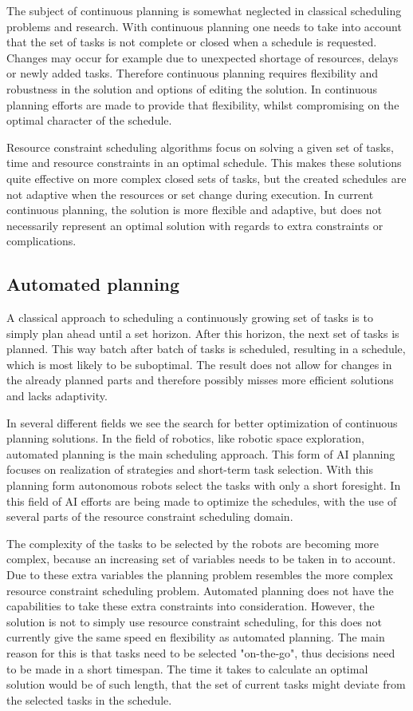 \documentclass{article}
\begin{document}
The subject of continuous planning is somewhat neglected in classical scheduling problems and research.
With continuous planning one needs to take into account that the set of tasks is not complete or closed when a schedule is requested.
Changes may occur for example due to unexpected shortage of resources, delays or newly added tasks.
Therefore continuous planning requires flexibility and robustness in the solution and options of editing the solution.
In continuous planning efforts are made to provide that flexibility, whilst compromising on the optimal character of the schedule.

Resource constraint scheduling algorithms focus on solving a given set of tasks, time and resource constraints in an optimal schedule.
This makes these solutions quite effective on more complex closed sets of tasks, but the created schedules are not adaptive when the resources or set change during execution.
In current continuous planning, the solution is more flexible and adaptive, but does not necessarily represent an optimal solution with regards to extra constraints or complications.
\cite{laborie03}

\subsection{Automated planning}

A classical approach to scheduling a continuously growing set of tasks is to simply plan ahead until a set horizon.
After this horizon, the next set of tasks is planned.
This way batch after batch of tasks is scheduled, resulting in a schedule, which is most likely to be suboptimal.
The result does not allow for changes in the already planned parts and therefore possibly misses more efficient solutions and lacks adaptivity.
\cite{chien00}

In several different fields we see the search for better optimization of continuous planning solutions.
In the field of robotics, like robotic space exploration, automated planning is the main scheduling approach.
This form of AI planning focuses on realization of strategies and short-term task selection.
With this planning form autonomous robots select the tasks with only a short foresight.
In this field of AI efforts are being made to optimize the schedules, with the use of several parts of the resource constraint scheduling domain.
\cite{smith00}

The complexity of the tasks to be selected by the robots are becoming more complex, because an increasing set of variables needs to be taken in to account.
Due to these extra variables the planning problem resembles the more complex resource constraint scheduling problem.
Automated planning does not have the capabilities to take these extra constraints into consideration.
However, the solution is not to simply use resource constraint scheduling, for this does not currently give the same speed en flexibility as automated planning.
The main reason for this is that tasks need to be selected "on-the-go", thus decisions need to be made in a short timespan.
The time it takes to calculate an optimal solution would be of such length, that the set of current tasks might deviate from the selected tasks in the schedule.
\end{document}
